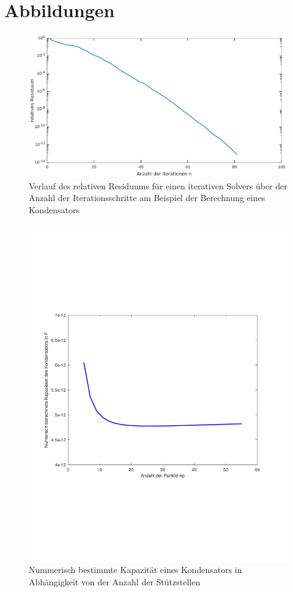 \documentclass[Protokollheft.tex]{subfiles}
\begin{document}
\clearpage
\newpage
\section{Abbildungen}
\begin{figure}[h!]
	\centering
	\includegraphics[width=0.7\linewidth]{ResidiumIterationenGraph.pdf}
	\caption{Verlauf des relativen Residuums für einen iterativen Solvers über der Anzahl der Iterationsschritte am Beispiel der Berechnung eines Kondensators}
	\label{fig:residiumiIterationen}
\end{figure}

\begin{figure}[h!]
	\centering
	\includegraphics[trim = 10mm 65mm 20mm 70mm, clip,width=0.7\linewidth]{KapazitaetUeberAnzStuetzstellen.pdf}
	\caption{Nummerisch bestimmte Kapazität eines Kondensators in Abhängigkeit von der Anzahl der Stützstellen}
	\label{fig:kapazitaetueberanzstuetzstellen}
\end{figure}
\end{document}
